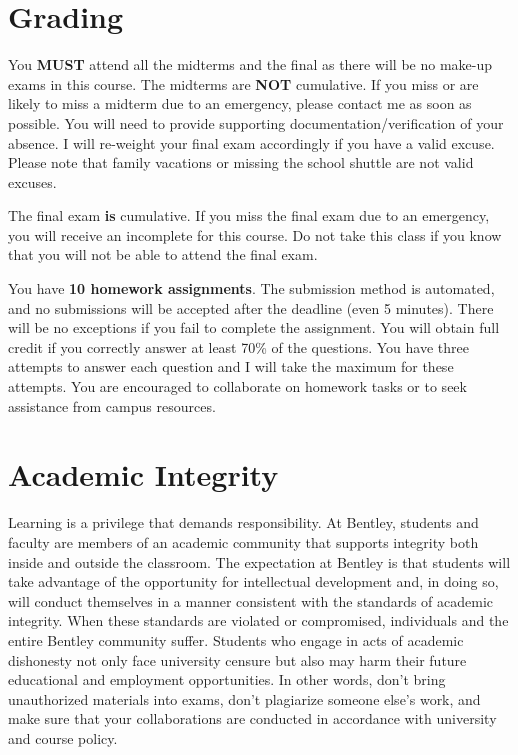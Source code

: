 \documentclass[11pt,letterpaper]{article}
\begin{document}
\section*{Grading}

You \textbf{MUST} attend all the midterms and the final as there will be no make-up exams in this course. The midterms are \textbf{NOT} cumulative. If you miss or are likely to miss a midterm due to an emergency, please contact me as soon as possible. You will need to provide supporting documentation/verification of your absence. I will re-weight your final exam accordingly if you have a valid excuse. Please note that family vacations or missing the school shuttle are not valid excuses.

The final exam \textbf{is} cumulative. If you miss the final exam due to an emergency, you will receive an incomplete for this course. Do not take this class if you know that you will not be able to attend the final exam.

You have \textbf{10 homework assignments}. The submission method is automated, and no submissions will be accepted after the deadline (even 5 minutes). There will be no exceptions if you fail to complete the assignment. You will obtain full credit if you correctly answer at least 70\% of the questions. You have three attempts to answer each question and I will take the maximum for these attempts. You are encouraged to collaborate on homework tasks or to seek assistance from campus resources.

\section*{Academic Integrity}

Learning is a privilege that demands responsibility. At Bentley, students and faculty are members of an academic community that supports integrity both inside and outside the classroom. The expectation at Bentley is that students will take advantage of the opportunity for intellectual development and, in doing so, will conduct themselves in a manner consistent with the standards of academic integrity. When these standards are violated or compromised, individuals and the entire Bentley community suffer. Students who engage in acts of academic dishonesty not only face university censure but also may harm their future educational and employment opportunities. In other words, don't bring unauthorized materials into exams, don't plagiarize someone else's work, and make sure that your collaborations are conducted in accordance with university and course policy.
\end{document}
